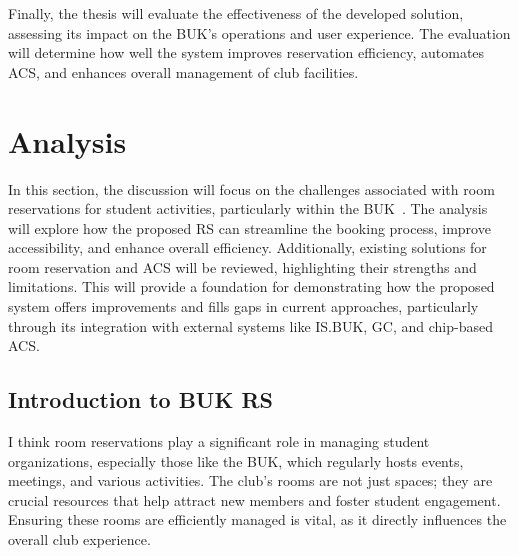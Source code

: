 Finally, the thesis will evaluate the effectiveness of the developed solution, assessing its impact on the BUK’s operations and user experience. The evaluation will determine how well the system improves reservation efficiency, automates ACS, and enhances overall management of club facilities.


\chapter{Analysis}

In this section, the discussion will focus on the challenges associated with room reservations for student activities, particularly within the BUK~\cite{SUBuben}. The analysis will explore how the proposed RS can streamline the booking process, improve accessibility, and enhance overall efficiency. Additionally, existing solutions for room reservation and ACS will be reviewed, highlighting their strengths and limitations. This will provide a foundation for demonstrating how the proposed system offers improvements and fills gaps in current approaches, particularly through its integration with external systems like IS.BUK, GC, and chip-based ACS. 

\section{Introduction to BUK RS}

I think room reservations play a significant role in managing student organizations, especially those like the BUK, which regularly hosts events, meetings, and various activities. The club’s rooms are not just spaces; they are crucial resources that help attract new members and foster student engagement. Ensuring these rooms are efficiently managed is vital, as it directly influences the overall club experience.

